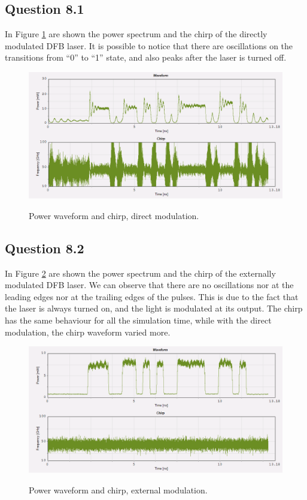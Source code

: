 \documentclass[a4paper,10pt]{report}
\begin{document}
\subsection*{Question 8.1}
In Figure \ref{8_1} are shown the power spectrum and the chirp of the directly modulated DFB laser.
It is possible to notice that there are oscillations on the transitions from ``0'' to ``1'' state, and also peaks after the laser is turned off.

\begin{figure}[!ht]
  \centering
  \includegraphics[width=12cm]{8_1.png}\\
  \caption{Power waveform and chirp, direct modulation.}
  \label{8_1}
\end{figure}

\subsection*{Question 8.2}
In Figure \ref{8_2} are shown the power spectrum and the chirp of the externally modulated DFB laser.
We can observe that there are no oscillations nor at the leading edges nor at the trailing edges of the pulses.
This is due to the fact that the laser is always turned on, and the light is modulated at its output.
The chirp has the same behaviour for all the simulation time, while with the direct modulation, the chirp waveform varied more.

\begin{figure}[!ht]
  \centering
  \includegraphics[width=12cm]{8_2.png}\\
  \caption{Power waveform and chirp, external modulation.}
  \label{8_2}
\end{figure}
\end{document}
